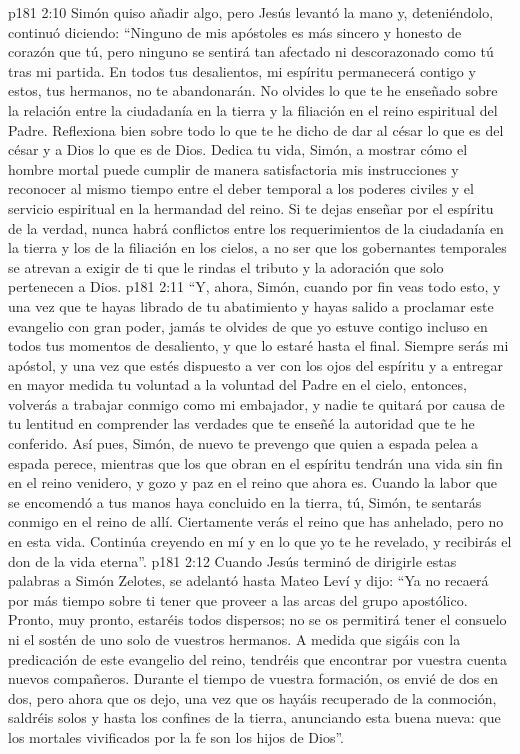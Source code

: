 \vs p181 2:10 Simón quiso añadir algo, pero Jesús levantó la mano y, deteniéndolo, continuó diciendo: “Ninguno de mis apóstoles es más sincero y honesto de corazón que tú, pero ninguno se sentirá tan afectado ni descorazonado como tú tras mi partida. En todos tus desalientos, mi espíritu permanecerá contigo y estos, tus hermanos, no te abandonarán. No olvides lo que te he enseñado sobre la relación entre la ciudadanía en la tierra y la filiación en el reino espiritual del Padre. Reflexiona bien sobre todo lo que te he dicho de dar al césar lo que es del césar y a Dios lo que es de Dios. Dedica tu vida, Simón, a mostrar cómo el hombre mortal puede cumplir de manera satisfactoria mis instrucciones y reconocer al mismo tiempo entre el deber temporal a los poderes civiles y el servicio espiritual en la hermandad del reino. Si te dejas enseñar por el espíritu de la verdad, nunca habrá conflictos entre los requerimientos de la ciudadanía en la tierra y los de la filiación en los cielos, a no ser que los gobernantes temporales se atrevan a exigir de ti que le rindas el tributo y la adoración que solo pertenecen a Dios.
\vs p181 2:11 \pc “Y, ahora, Simón, cuando por fin veas todo esto, y una vez que te hayas librado de tu abatimiento y hayas salido a proclamar este evangelio con gran poder, jamás te olvides de que yo estuve contigo incluso en todos tus momentos de desaliento, y que lo estaré hasta el final. Siempre serás mi apóstol, y una vez que estés dispuesto a ver con los ojos del espíritu y a entregar en mayor medida tu voluntad a la voluntad del Padre en el cielo, entonces, volverás a trabajar conmigo como mi embajador, y nadie te quitará por causa de tu lentitud en comprender las verdades que te enseñé la autoridad que te he conferido. Así pues, Simón, de nuevo te prevengo que quien a espada pelea a espada perece, mientras que los que obran en el espíritu tendrán una vida sin fin en el reino venidero, y gozo y paz en el reino que ahora es. Cuando la labor que se encomendó a tus manos haya concluido en la tierra, tú, Simón, te sentarás conmigo en el reino de allí. Ciertamente verás el reino que has anhelado, pero no en esta vida. Continúa creyendo en mí y en lo que yo te he revelado, y recibirás el don de la vida eterna”.
\vs p181 2:12 \pc Cuando Jesús terminó de dirigirle estas palabras a Simón Zelotes, se adelantó hasta Mateo Leví y dijo: “Ya no recaerá por más tiempo sobre ti tener que proveer a las arcas del grupo apostólico. Pronto, muy pronto, estaréis todos dispersos; no se os permitirá tener el consuelo ni el sostén de uno solo de vuestros hermanos. A medida que sigáis con la predicación de este evangelio del reino, tendréis que encontrar por vuestra cuenta nuevos compañeros. Durante el tiempo de vuestra formación, os envié de dos en dos, pero ahora que os dejo, una vez que os hayáis recuperado de la conmoción, saldréis solos y hasta los confines de la tierra, anunciando esta buena nueva: que los mortales vivificados por la fe son los hijos de Dios”.
